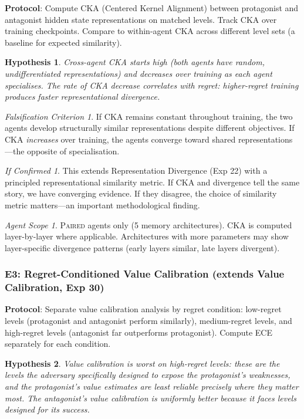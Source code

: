 \documentclass[11pt,a4paper]{article}
\newtheorem{hypothesis}{Hypothesis}[subsection]
\theoremstyle{remark}
\newtheorem*{falsification}{Falsification Criterion}
\newtheorem*{implication}{If Confirmed}
\newtheorem*{agentscope}{Agent Scope}
\newcommand{\paired}{\textsc{Paired}}
\begin{document}
\textbf{Protocol}: Compute CKA (Centered Kernel Alignment) between protagonist and antagonist hidden state representations on matched levels. Track CKA over training checkpoints. Compare to within-agent CKA across different level sets (a baseline for expected similarity).

\begin{hypothesis}
Cross-agent CKA starts high (both agents have random, undifferentiated representations) and decreases over training as each agent specialises. The rate of CKA decrease correlates with regret: higher-regret training produces faster representational divergence.
\end{hypothesis}

\begin{falsification}
If CKA remains constant throughout training, the two agents develop structurally similar representations despite different objectives. If CKA \textit{increases} over training, the agents converge toward shared representations---the opposite of specialisation.
\end{falsification}

\begin{implication}
This extends Representation Divergence (Exp 22) with a principled representational similarity metric. If CKA and divergence tell the same story, we have converging evidence. If they disagree, the choice of similarity metric matters---an important methodological finding.
\end{implication}

\begin{agentscope}
\paired{} agents only (5 memory architectures). CKA is computed layer-by-layer where applicable. Architectures with more parameters may show layer-specific divergence patterns (early layers similar, late layers divergent).
\end{agentscope}

\subsubsection{E3: Regret-Conditioned Value Calibration (extends Value Calibration, Exp 30)}
\label{exp:e3}

\textbf{Protocol}: Separate value calibration analysis by regret condition: low-regret levels (protagonist and antagonist perform similarly), medium-regret levels, and high-regret levels (antagonist far outperforms protagonist). Compute ECE separately for each condition.

\begin{hypothesis}
Value calibration is worst on high-regret levels: these are the levels the adversary specifically designed to expose the protagonist's weaknesses, and the protagonist's value estimates are least reliable precisely where they matter most. The antagonist's value calibration is uniformly better because it faces levels designed for its success.
\end{hypothesis}
\end{document}
